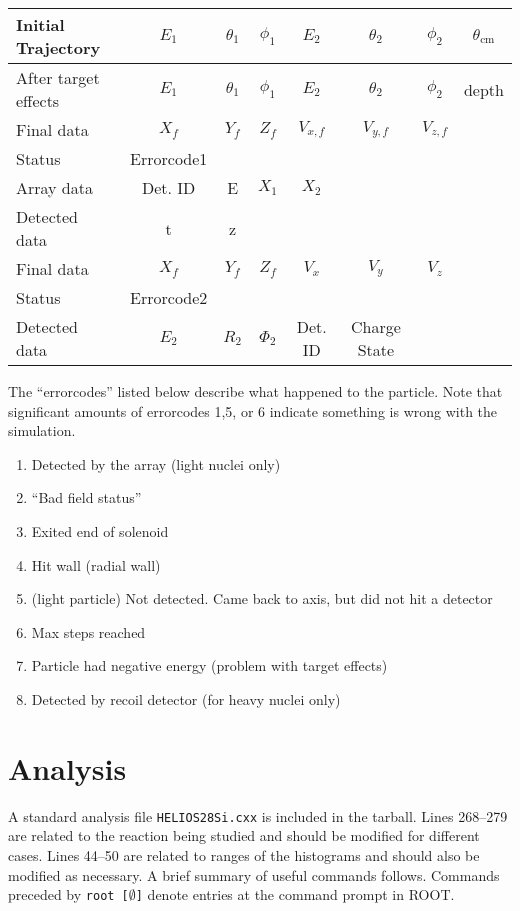 \begin{table}[ht]%
\centering
\begin{tabular}{l|c|c|c|c|c|c|c}
Initial Trajectory&$E_1$&	$\theta_1$&$\phi_1$&$E_2$&$\theta_2$&$\phi_2$&	$\theta_\mathrm{cm}$\\\hline
After target effects&$E_1$&	$\theta_1$&$\phi_1$&$E_2$&$\theta_2$&$\phi_2$&depth\\\hline
Final data&	$X_f$&	$Y_f$	&$Z_f$&	$V_{x,f}$&$	V_{y,f}$	&$V_{z,f}$	\\\hline
Status&	Errorcode1						&&&&&&\\\hline
{\color{blue}Array data}&	Det. ID	&E&$X_1$&$X_2$&&&\\\hline
{\color{blue}Detected data} &	t&	z				&&&&&\\\hline	
Final data&$X_f$&$Y_f$&$Z_f$&$V_x$&$V_y$&$V_z$&\\\hline
Status&Errorcode2&&&&&&\\\hline
{\color{magenta}Detected data}&$E_2$&$R_2$&$\Phi_2$&	Det. ID&	Charge State		&&\\\hline
\end{tabular}
\end{table}
The ``errorcodes'' listed below describe what happened to the particle.  Note that significant amounts of errorcodes 1,5, or 6 indicate something is wrong with the simulation. 
\vspace{-1.0\baselineskip}
\begin{singlespace}
\begin{enumerate}
	\addtocounter{enumi}{-1}
	\setlength{\itemsep}{0pt}
  \setlength{\parskip}{0pt}
  \setlength{\parsep}{0pt}
	\item Detected by the array (light nuclei only)
	\item	``Bad field status''
	\item Exited end of solenoid 
	\item Hit wall (radial wall)
	\item (light particle) Not detected. Came back to axis, but did not hit a detector
	\item Max steps reached 
	\item Particle had negative energy (problem with target effects)
	\item Detected by recoil detector (for heavy nuclei only) 
\end{enumerate}
\end{singlespace}

\section{Analysis}
A standard analysis file \texttt{HELIOS28Si.cxx} is included in the tarball.  Lines 268--279 are related to the reaction being studied and should be modified for different cases.  Lines 44--50 are related to ranges of the histograms and should also be modified as necessary.  A brief summary of useful commands follows.  Commands preceded by {\color{blue}\texttt{root [$\emptyset$]}} denote entries at the command prompt in ROOT.  

